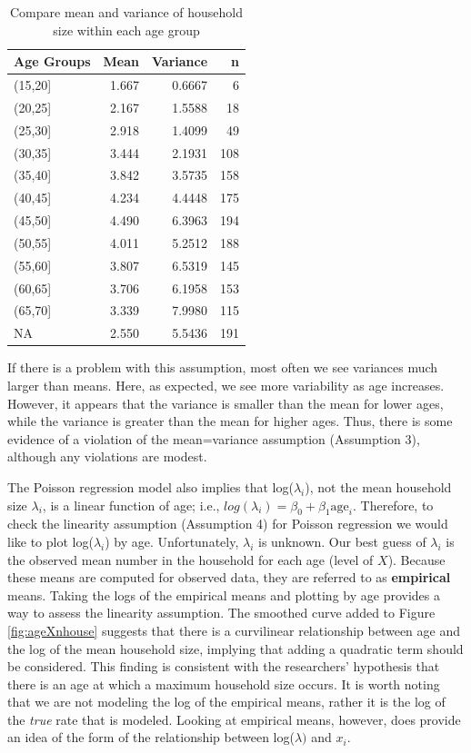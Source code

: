 \documentclass[
]{krantz}
\begin{document}
\begin{table}

\caption{\label{tab:table1chp4}Compare mean and variance of household size within each age group}
\centering
\begin{tabular}[t]{lrrr}
\toprule
Age Groups & Mean & Variance & n\\
\midrule
(15,20] & 1.667 & 0.6667 & 6\\
(20,25] & 2.167 & 1.5588 & 18\\
(25,30] & 2.918 & 1.4099 & 49\\
(30,35] & 3.444 & 2.1931 & 108\\
(35,40] & 3.842 & 3.5735 & 158\\
\addlinespace
(40,45] & 4.234 & 4.4448 & 175\\
(45,50] & 4.490 & 6.3963 & 194\\
(50,55] & 4.011 & 5.2512 & 188\\
(55,60] & 3.807 & 6.5319 & 145\\
(60,65] & 3.706 & 6.1958 & 153\\
\addlinespace
(65,70] & 3.339 & 7.9980 & 115\\
NA & 2.550 & 5.5436 & 191\\
\bottomrule
\end{tabular}
\end{table}

If there is a problem with this assumption, most often we see variances much larger than means. Here, as expected, we see more variability as age increases. However, it appears that the variance is smaller than the mean for lower ages, while the variance is greater than the mean for higher ages. Thus, there is some evidence of a violation of the mean=variance assumption (Assumption 3), although any violations are modest.

The Poisson regression model also implies that log(\(\lambda_i\)), not the mean household size \(\lambda_i\), is a linear function of age; i.e., \(log(\lambda_i)=\beta_0+\beta_1\textrm{age}_i\). Therefore, to check the linearity assumption (Assumption 4) for Poisson regression we would like to plot log(\(\lambda_i\)) by age. Unfortunately, \(\lambda_i\) is unknown. Our best guess of \(\lambda_i\) is the observed mean number in the household for each age (level of \(X\)). Because these means are computed for observed data, they are referred to as \textbf{empirical} means. Taking the logs of the empirical means and plotting by age provides a way to assess the linearity assumption. The smoothed curve added to Figure \ref{fig:ageXnhouse} suggests that there is a curvilinear relationship between age and the log of the mean household size, implying that adding a quadratic term should be considered. This finding is consistent with the researchers' hypothesis that there is an age at which a maximum household size occurs. It is worth noting that we are not modeling the log of the empirical means, rather it is the log of the \emph{true} rate that is modeled. Looking at empirical means, however, does provide an idea of the form of the relationship between log(\(\lambda)\) and \(x_i\).
\end{document}
